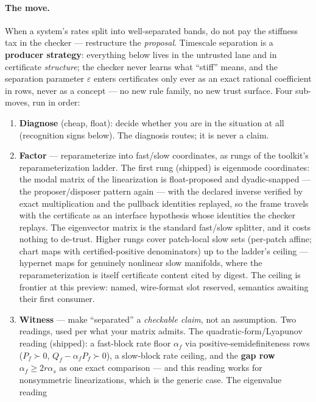 \paragraph{The move.} When a system's rates split into well-separated
bands, do not pay the stiffness tax in the checker --- restructure the
\emph{proposal}. Timescale separation is a \textbf{producer strategy}:
everything below lives in the untrusted lane and in certificate
\emph{structure}; the checker never learns what ``stiff'' means, and
the separation parameter $\varepsilon$ enters certificates only ever as
an exact rational coefficient in rows, never as a concept --- no new
rule family, no new trust surface. Four sub-moves, run in order:

\begin{enumerate}
\item \textbf{Diagnose} (cheap, float): decide whether you are in the
  situation at all (recognition signs below). The diagnosis routes; it
  is never a claim.
\item \textbf{Factor} --- reparameterize into fast/slow coordinates,
  as rungs of the toolkit's reparameterization ladder. The first rung
  (shipped) is eigenmode coordinates: the modal matrix of the
  linearization is float-proposed and dyadic-snapped --- the
  proposer/disposer pattern again --- with the declared inverse
  verified by exact multiplication and the pullback identities
  replayed, so the frame travels with the certificate as an interface
  hypothesis whose identities the checker replays. The eigenvector
  matrix is the standard fast/slow splitter, and it costs nothing to
  de-trust. Higher rungs cover patch-local slow sets (per-patch
  affine; chart maps with certified-positive denominators) up to the
  ladder's ceiling --- hypernet maps for genuinely nonlinear slow
  manifolds, where the reparameterization is itself certificate
  content cited by digest. The ceiling is frontier at this preview:
  named, wire-format slot reserved, semantics awaiting their first
  consumer.
\item \textbf{Witness} --- make ``separated'' a \emph{checkable
  claim}, not an assumption. Two readings, used per what your matrix
  admits. The quadratic-form/Lyapunov reading (shipped): a fast-block
  rate floor $\alpha_f$ via positive-semidefiniteness rows
  ($P_f \succ 0$, $Q_f - \alpha_f P_f \succ 0$), a slow-block rate
  ceiling, and the \textbf{gap row} $\alpha_f \ge 2 r \alpha_s$ as one
  exact comparison --- and this reading works for nonsymmetric
  linearizations, which is the generic case. The eigenvalue reading

\end{enumerate}
